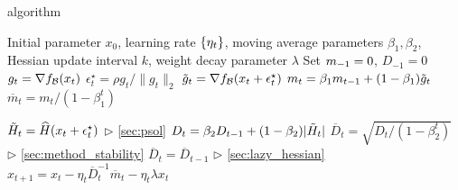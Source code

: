 \begin{algorithm}[t!]
    \small
    \caption{\sassha algorithm}
    \begin{algorithmic}[1]
           Initial parameter $x_0$, learning rate $\{\eta_\mathnormal{t}\}$,  moving average parameters $\beta_{1},\beta_{2}$, Hessian update interval $k$, weight decay parameter $\lambda$
          \STATE Set $\mathnormal{m}_{-1} = 0$, $D_{-1} = 0$
            \STATE $\mathnormal{g}_\mathnormal{t} = \nabla f_\mathcal{B}(x_t)$
            \STATE $\epsilon^\star_t=\rho g_t/\|g_t\|_2$  
            \STATE $\Tilde{g}_{t} = \nabla f_\mathcal{B}(x_t + \epsilon^\star_t)$
            \STATE  $m_t = \beta_{1} m_{t-1} + (1 - \beta_{1}) \Tilde{g}_{t}$ 
            \STATE $\overline{m}_t = m_t / (1 - \beta_1^t)$ 
            
                \STATE $\Tilde{H}_t = \widehat{H}(x_t + \epsilon^\star_t)$ \hfill$\triangleright$ \cref{sec:psol} 
                \STATE $D_\mathnormal{t} = \beta_2 D_{t-1} + (1 - \beta_2) |\Tilde{H}_t| $ 
                \STATE $\overline{D}_{t} = \sqrt{D_t/(1 - \beta_2^t)}$ \hfill $\triangleright$ 
                \cref{sec:method_stability}
            \ELSE
                \STATE $\overline{D}_t=\overline{D}_{t-1}$ \hfill$\triangleright$ \cref{sec:lazy_hessian}
            \ENDIF
            \STATE $x_{t+1} = x_t - \eta_{t} \overline{D}_{t}^{-1} \overline{m}_t - \eta_t \lambda x_t$
        \ENDFOR
    \end{algorithmic}
    \label{algo:sassha}
\end{algorithm}

